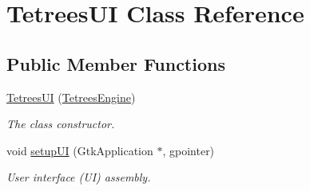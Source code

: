 \hypertarget{classTetreesUI}{}\section{Tetrees\+UI Class Reference}
\label{classTetreesUI}
\subsection*{Public Member Functions}
\begin{DoxyCompactItemize}
\item 
\mbox{\hyperlink{classTetreesUI_ad6a5b91b1574c25c2bcd48601142013c}{Tetrees\+UI}} (\mbox{\hyperlink{classTetreesEngine}{Tetrees\+Engine}})
\begin{DoxyCompactList}\small\item\em The class constructor. \end{DoxyCompactList}\item 
void \mbox{\hyperlink{classTetreesUI_a492d68860089cfbe52c5756b2c3cd2ae}{setup\+UI}} (Gtk\+Application $\ast$, gpointer)
\begin{DoxyCompactList}\small\item\em User interface (UI) assembly. \end{DoxyCompactList}\end{DoxyCompactItemize}
